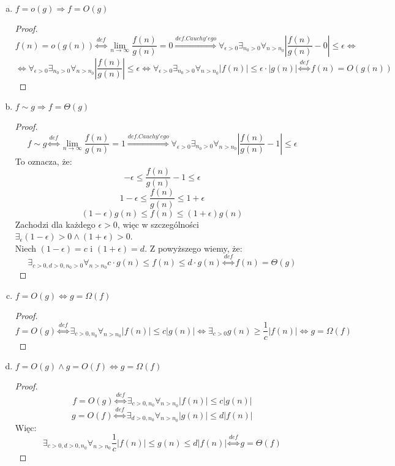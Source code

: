 \documentclass[a4paper]{article}
\begin{document}
\begin{enumerate}[(a)]
\item $f=o(g) \Rightarrow f=O(g) $
\begin{proof}
$$f(n)=o(g(n)) \overset{def}{\Leftrightarrow} \lim_{n\rightarrow \infty} \frac{f(n)}{g(n)}=0 \overset{def. Cauchy'ego}{\Rightarrow} \forall_{\epsilon>0} \exists_{n_0 > 0} \forall_{n > n_0} |\frac{f(n)}{g(n)} - 0| \leq \epsilon \Leftrightarrow$$
$$\Leftrightarrow \forall_{\epsilon>0} \exists_{n_0 > 0} \forall_{n > n_0} |\frac{f(n)}{g(n)}| \leq \epsilon \Leftrightarrow \forall_{\epsilon>0} \exists_{n_0 > 0} \forall_{n > n_0} |f(n)| \leq \epsilon \cdot |g(n)| \overset{def}{\Leftrightarrow} f(n)=O(g(n)) $$
\end{proof}
\item $f\sim g \Rightarrow f=\Theta(g)$

\begin{proof}
$$f\sim g \overset{def}{\Leftrightarrow} \lim_{n\rightarrow \infty} \frac{f(n)}{g(n)}=1 \overset{def. Cauchy'ego}{\Rightarrow} \forall_{\epsilon>0} \exists_{n_0 > 0} \forall_{n > n_0} |\frac{f(n)}{g(n)} - 1| \leq \epsilon$$
To oznacza, że:
$$-\epsilon \leq \frac{f(n)}{g(n)} - 1 \leq \epsilon$$
$$1-\epsilon \leq \frac{f(n)}{g(n)}\leq 1+\epsilon$$
$$(1-\epsilon)g(n) \leq f(n)\leq (1+\epsilon)g(n)$$
Zachodzi dla każdego $\epsilon>0$, więc w szczególności $\exists_{\epsilon} (1-\epsilon)>0 \wedge (1+\epsilon)>0$.\\
Niech $(1-\epsilon)=c$ i $(1+\epsilon)=d$. Z powyższego wiemy, że:
$$\exists_{c>0,d>0,n_0>0} \forall_{n>n_0} c\cdot g(n) \leq f(n) \leq d \cdot g(n) \overset{def}{\Leftrightarrow} f(n)=\Theta(g)$$ 
\end{proof}

\item $f=O(g) \Leftrightarrow g=\Omega(f)$
\begin{proof}
$$f=O(g) \overset{def}{\Leftrightarrow} \exists_{c>0, n_0} \forall_{n>n_0} |f(n)|\leq c|g(n)| \Leftrightarrow \exists_{c>0} g(n)\geq \frac{1}{c} |f(n)| \Leftrightarrow g=\Omega(f)$$
\end{proof}

\item $f=O(g) \wedge g=O(f) \Leftrightarrow g=\Omega(f)$
\begin{proof}
$$f=O(g) \overset{def}{\Leftrightarrow} \exists_{c>0, n_0} \forall_{n>n_0} |f(n)|\leq c|g(n)| $$
$$g=O(f) \overset{def}{\Leftrightarrow} \exists_{d>0, n_0} \forall_{n>n_0} |g(n)|\leq d|f(n)| $$
Więc:
$$\exists_{c>0, d>0, n_0} \forall_{n>n_0} \frac{1}{c}|f(n)|\leq g(n) \leq d|f(n)|\overset{def}{\Leftrightarrow} g=\Theta(f)$$
\end{proof}

\end{enumerate}
\end{document}
